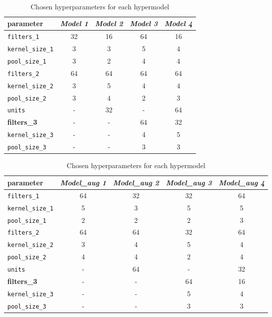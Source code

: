 \begin{table}
    \begin{subtable}{\textwidth}\
        \centering
        \begin{tabular}{lcccc}
            \textbf{parameter} & \textsl{Model 1} & \textsl{Model 2} & \textsl{Model 3} & \textsl{Model 4} \\
            \midrule
            \texttt{filters\_1}         & 32 & 16 & 64 & 16 \\
            \texttt{kernel\_size\_1}    & 3 & 3 & 5 & 4 \\
            \texttt{pool\_size\_1}      & 3 & 2 & 4 & 4 \\
            \texttt{filters\_2}         & 64 & 64 & 64 & 64 \\
            \texttt{kernel\_size\_2}    & 3 & 5 & 4 & 4 \\
            \texttt{pool\_size\_2}      & 3 & 4 & 2 & 3 \\
            \texttt{units}              & - & 32 & - & 64 \\
            \textbf{filters\_3}         & - & - & 64 & 32 \\
            \texttt{kernel\_size\_3}    & - & - & 4 & 5 \\
            \texttt{pool\_size\_3}      & - & - & 3 & 3 \\
        \end{tabular}
        \label{tab:chosenHyperparameters_tuners}
    \end{subtable}
    \bigbreak
    \bigbreak
    \begin{subtable}{\textwidth}
        \centering
        \begin{tabular}{lcccc}
            \textbf{parameter} & \textsl{Model\_aug 1} & \textsl{Model\_aug 2} & \textsl{Model\_aug 3} & \textsl{Model\_aug 4} \\
            \midrule
            \texttt{filters\_1}         & 64 & 32 & 32 & 64 \\
            \texttt{kernel\_size\_1}    & 5 & 3 & 5 & 5 \\
            \texttt{pool\_size\_1}      & 2 & 2 & 2 & 3 \\
            \texttt{filters\_2}         & 64 & 64 & 32 & 64 \\
            \texttt{kernel\_size\_2}    & 3 & 4 & 5 & 4 \\
            \texttt{pool\_size\_2}      & 4 & 4 & 2 & 4 \\
            \texttt{units}              & - & 64 & - & 32 \\
            \textbf{filters\_3}         & - & - & 64 & 16 \\
            \texttt{kernel\_size\_3}    & - & - & 5 & 4 \\
            \texttt{pool\_size\_3}      & - & - & 3 & 3 \\
        \end{tabular}
        \label{tab:chosenHyperparameters_tuners_augmented}
    \end{subtable}   
    \caption{Chosen hyperparameters for each hypermodel}    
    \label{tab:chosenHyperparameters}
\end{table}